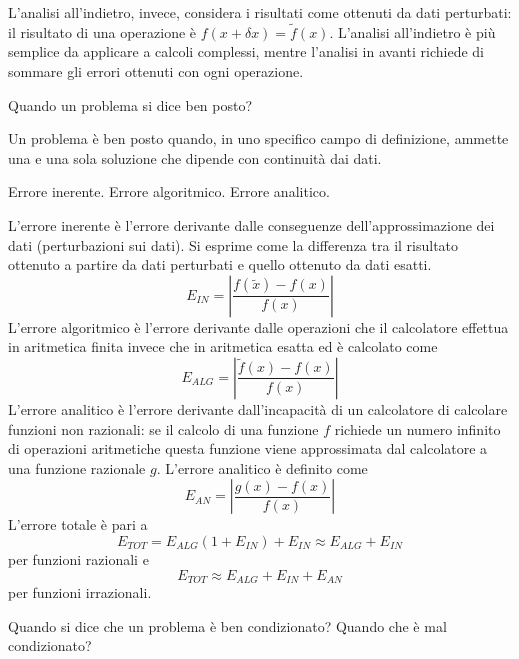 \documentclass[answers, a4paper]{exam}
\begin{document}
\begin{questions}
\begin{solution}
		L'analisi all'indietro, invece, considera i risultati come ottenuti da dati perturbati: il risultato di una operazione è $f(x + \delta x) = \tilde{f}(x)$. 
		L'analisi all'indietro è più semplice da applicare a calcoli complessi, mentre l'analisi in avanti richiede di sommare gli errori ottenuti con ogni operazione.
	\end{solution}
	\question Quando un problema si dice ben posto?
	\begin{solution}
	Un problema è ben posto quando, in uno specifico campo di definizione, ammette una e una sola soluzione che dipende con continuità dai dati.
\end{solution}
		\question Errore inerente. Errore algoritmico. Errore analitico. 
		\begin{solution}
			L'errore inerente è l'errore derivante dalle conseguenze dell'approssimazione dei dati (perturbazioni sui dati).
			Si esprime come la differenza tra il risultato ottenuto a partire da dati perturbati e quello ottenuto da dati esatti.
			\begin{equation}
				E_{IN} = |\frac{f(\tilde{x}) - f(x)}{f(x)}|
			\end{equation}
			L'errore algoritmico è l'errore derivante dalle operazioni che il calcolatore effettua in aritmetica finita invece che in aritmetica esatta ed è calcolato come
			\begin{equation}
				E_{ALG} = |\frac{\tilde{f}(x) - f(x)}{f(x)}|
			\end{equation}
			L'errore analitico è l'errore derivante dall'incapacità di un calcolatore di calcolare funzioni non razionali: se il calcolo di una funzione $f$ richiede un numero infinito di operazioni aritmetiche questa funzione viene approssimata dal calcolatore a una funzione razionale $g$. 
			L'errore analitico è definito come 
			\begin{equation}
				E_{AN} = |\frac{g(x) - f(x)}{f(x)}|
			\end{equation}
			L'errore totale è pari a 
			\begin{equation}
				E_{TOT} = E_{ALG} (1 + E_{IN}) + E_{IN} \approx E_{ALG} + E_{IN}
			\end{equation}
			per funzioni razionali e 
			\begin{equation}
				E_{TOT} \approx E_{ALG} + E_{IN} + E_{AN}
			\end{equation}
			per funzioni irrazionali.
		\end{solution}
	\question Quando si dice che un problema è ben condizionato? Quando che è mal condizionato?

\end{questions}
\end{document}
